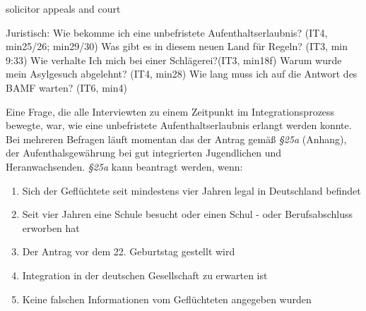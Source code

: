 	\item[Gesetzlichen Grundlagen]
		solicitor
		appeals and court
		
		Juristisch:
    Wie bekomme ich eine unbefristete Aufenthaltserlaubnis? (IT4, min25/26; min29/30)
    Was gibt es in diesem neuen Land für Regeln? (IT3, min 9:33)
    Wie verhalte Ich mich bei einer Schlägerei?(IT3, min18f)
    Warum wurde mein Asylgesuch abgelehnt? (IT4, min28)
    Wie lang muss ich auf die Antwort des BAMF warten? (IT6, min4)
    
Eine Frage, die alle Interviewten zu einem Zeitpunkt im Integrationsprozess bewegte, war, wie eine unbefristete Aufenthaltserlaubnis erlangt werden konnte. Bei mehreren Befragen läuft momentan das der Antrag gemäß \textit{§25a} (Anhang), der Aufenthalsgewährung bei gut integrierten Jugendlichen und Heranwachsenden.\newline
\textit{§25a} kann beantragt werden, wenn:
    \begin{enumerate}
        \item Sich der Geflüchtete seit mindestens vier Jahren legal in Deutschland befindet
        \item Seit vier Jahren eine Schule besucht oder einen Schul - oder Berufsabschluss erworben hat
        \item Der Antrag vor dem 22. Geburtstag gestellt wird
        \item Integration in der deutschen Gesellschaft zu erwarten ist
        \item Keine falschen Informationen vom Geflüchteten angegeben wurden
    \end{enumerate}

